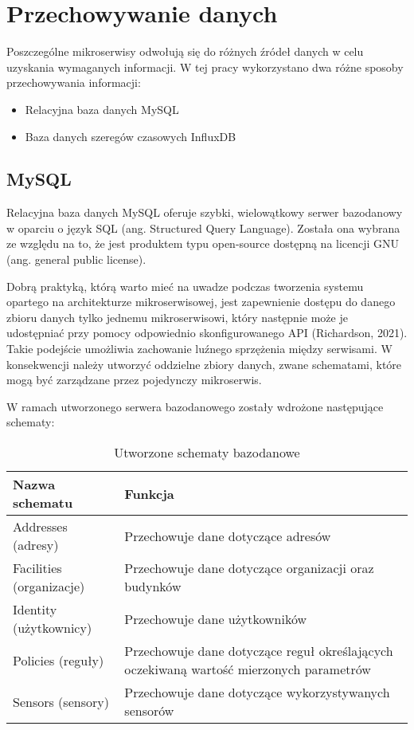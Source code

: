 \newpage
\section{Przechowywanie danych}

Poszczególne mikroserwisy odwołują się do różnych źródeł danych w celu uzyskania 
wymaganych informacji. W tej pracy wykorzystano dwa różne sposoby przechowywania 
informacji:

\begin{itemize} %
    \item Relacyjna baza danych MySQL
    \item Baza danych szeregów czasowych InfluxDB
\end{itemize}

\subsection{MySQL}

Relacyjna baza danych MySQL oferuje szybki, wielowątkowy serwer bazodanowy w oparciu 
o język SQL (ang. Structured Query Language). Została ona wybrana ze względu na to, że 
jest produktem typu open-source dostępną na licencji GNU (ang. general public license). 

Dobrą praktyką, którą warto mieć na uwadze podczas tworzenia systemu opartego na 
architekturze mikroserwisowej, jest zapewnienie dostępu do danego zbioru danych tylko 
jednemu mikroserwisowi, który następnie może je udostępniać przy pomocy odpowiednio 
skonfigurowanego API (Richardson, 2021). Takie podejście umożliwia zachowanie luźnego 
sprzężenia między serwisami. W konsekwencji należy utworzyć oddzielne zbiory 
danych, zwane schematami, które mogą być zarządzane przez pojedynczy mikroserwis.

W ramach utworzonego serwera bazodanowego zostały wdrożone następujące schematy:

    \begin{xltabular}{1\textwidth} { 
        | >{\raggedright\arraybackslash}X        
        | >{\raggedleft\arraybackslash}X | }
        \caption{Utworzone schematy bazodanowe} \label{tab:schematy-bazodanowe} \\
        \hline
       Nazwa schematu & Funkcja \\
       \hline
       Addresses (adresy) & 
       Przechowuje dane dotyczące adresów \\
       \hline
       Facilities (organizacje) &
       Przechowuje dane dotyczące organizacji oraz budynków \\
       \hline
       Identity (użytkownicy) &
       Przechowuje dane użytkowników \\
       \hline
       Policies (reguły) &
       Przechowuje dane dotyczące reguł określających oczekiwaną wartość mierzonych 
       parametrów \\
       \hline
       Sensors (sensory) & 
       Przechowuje dane dotyczące wykorzystywanych sensorów \\
       \hline
    \end{xltabular}


